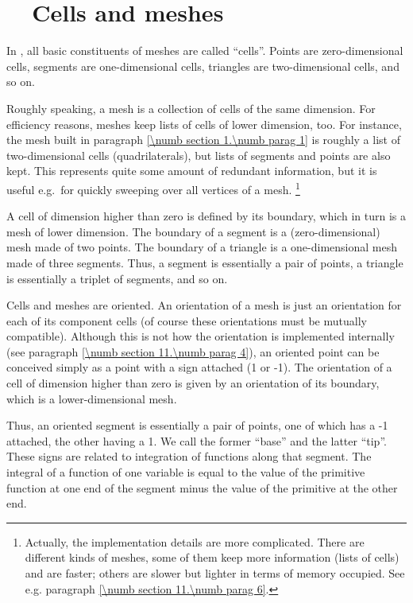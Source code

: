 \section{~~Cells and meshes}\label{\numb section 1.\numb parag 2}

In \maniFEM, all basic constituents of meshes are called ``cells''. 
Points are zero-dimensional cells, segments are one-dimensional cells, triangles are
two-dimensional cells, and so on.

Roughly speaking, a mesh is a collection of cells of the same dimension. 
For efficiency reasons, meshes keep lists of cells of lower dimension, too. 
For instance, the mesh built in paragraph \ref{\numb section 1.\numb parag 1} is 
roughly a list of two-dimensional cells (quadrilaterals), but lists of segments and points
are also kept.
This represents quite some amount of redundant information, but it is useful e.g.\ for
quickly sweeping over all vertices of a mesh.%
\footnote {Actually, the implementation details are more complicated.
There are different kinds of meshes, some of them keep more information (lists of cells)
and are faster; others are slower but lighter in terms of memory occupied.
See e.g. paragraph \ref{\numb section 11.\numb parag 6}.}

A cell of dimension higher than zero is defined by its boundary, 
which in turn is a mesh of lower dimension. 
The boundary of a segment is a (zero-dimensional) mesh made of two points.
The boundary of a triangle is a one-dimensional mesh made of three segments.
Thus, a segment is essentially a pair of points, a triangle is essentially a triplet of segments, and so on.

Cells and meshes are oriented. 
An orientation of a mesh is just an orientation for each of its component cells
(of course these orientations must be mutually compatible).
Although this is not how the orientation is implemented internally
(see paragraph \ref{\numb section 11.\numb parag 4}),
an oriented point can be conceived simply as a point with a sign attached (1 or -1). 
The orientation of a cell of dimension higher than zero is given by an orientation
of its boundary, which is a lower-dimensional mesh.

Thus, an oriented segment is essentially a pair of points, one of which has a \hbox{-1}
attached, the other having a 1.
We call the former ``base'' and the latter ``tip''.
These signs are related to integration of functions along that segment.
The integral of a function of one variable is equal to the value of the 
primitive function at one end of the segment minus the value of the primitive at the other end.

